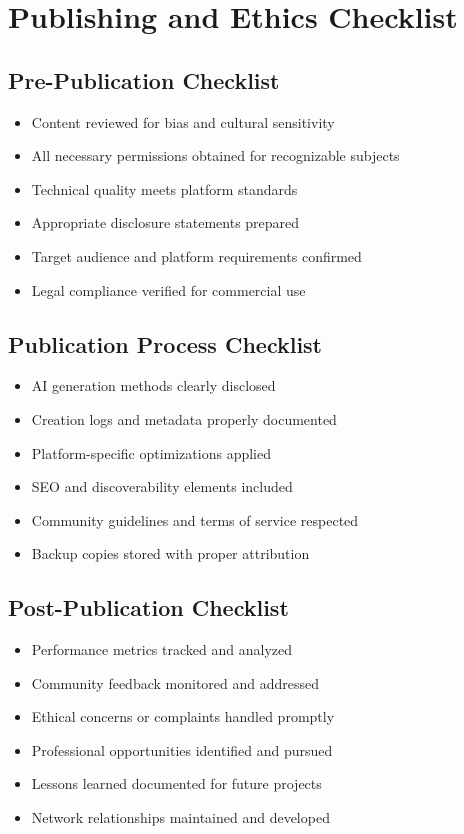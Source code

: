 \section*{Publishing and Ethics Checklist}

\subsection*{Pre-Publication Checklist}
\begin{itemize}
\item[$\square$] Content reviewed for bias and cultural sensitivity
\item[$\square$] All necessary permissions obtained for recognizable subjects
\item[$\square$] Technical quality meets platform standards
\item[$\square$] Appropriate disclosure statements prepared
\item[$\square$] Target audience and platform requirements confirmed
\item[$\square$] Legal compliance verified for commercial use
\end{itemize}

\subsection*{Publication Process Checklist}
\begin{itemize}
\item[$\square$] AI generation methods clearly disclosed
\item[$\square$] Creation logs and metadata properly documented
\item[$\square$] Platform-specific optimizations applied
\item[$\square$] SEO and discoverability elements included
\item[$\square$] Community guidelines and terms of service respected
\item[$\square$] Backup copies stored with proper attribution
\end{itemize}

\subsection*{Post-Publication Checklist}
\begin{itemize}
\item[$\square$] Performance metrics tracked and analyzed
\item[$\square$] Community feedback monitored and addressed
\item[$\square$] Ethical concerns or complaints handled promptly
\item[$\square$] Professional opportunities identified and pursued
\item[$\square$] Lessons learned documented for future projects
\item[$\square$] Network relationships maintained and developed
\end{itemize}

